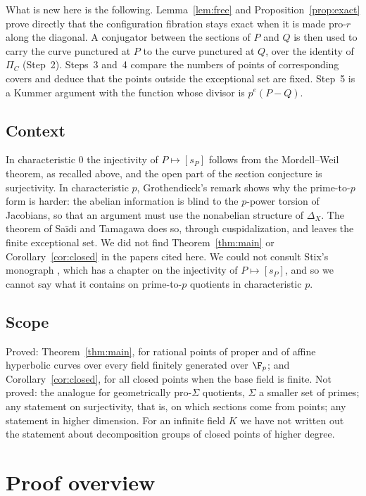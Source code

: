 What is new here is the following. Lemma~\ref{lem:free} and Proposition~\ref{prop:exact} prove directly that the configuration fibration stays exact when it is made pro-$r$ along the diagonal. A conjugator between the sections of $P$ and $Q$ is then used to carry the curve punctured at $P$ to the curve punctured at $Q$, over the identity of $\Pi_C$ (Step~2). Steps~3 and~4 compare the numbers of points of corresponding covers and deduce that the points outside the exceptional set are fixed. Step~5 is a Kummer argument with the function whose divisor is $p^e(P-Q)$.

\subsection{Context}
In characteristic $0$ the injectivity of $P\mapsto[s_P]$ follows from the Mordell--Weil theorem, as recalled above, and the open part of the section conjecture is surjectivity. In characteristic $p$, Grothendieck's remark shows why the prime-to-$p$ form is harder: the abelian information is blind to the $p$-power torsion of Jacobians, so that an argument must use the nonabelian structure of $\Delta_X$. The theorem of Sa\"idi and Tamagawa does so, through cuspidalization, and leaves the finite exceptional set. We did not find Theorem~\ref{thm:main} or Corollary~\ref{cor:closed} in the papers cited here. We could not consult Stix's monograph \cite{Stix}, which has a chapter on the injectivity of $P\mapsto[s_P]$, and so we cannot say what it contains on prime-to-$p$ quotients in characteristic $p$.

\subsection{Scope}
Proved: Theorem~\ref{thm:main}, for rational points of proper and of affine hyperbolic curves over every field finitely generated over $\F_p$; and Corollary~\ref{cor:closed}, for all closed points when the base field is finite. Not proved: the analogue for geometrically pro-$\Sigma$ quotients, $\Sigma$ a smaller set of primes; any statement on surjectivity, that is, on which sections come from points; any statement in higher dimension. For an infinite field $K$ we have not written out the statement about decomposition groups of closed points of higher degree.

\section{Proof overview}

